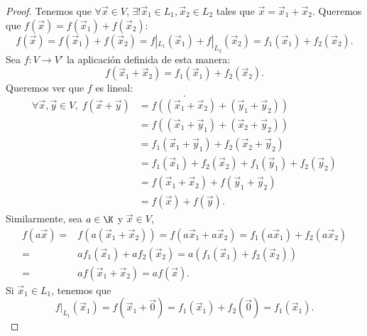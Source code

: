 \begin{proof}
Tenemos que $\displaystyle \forall\vec{x}\in V $, $\displaystyle \exists! \vec{x}_{1} \in L_{1}, \vec{x}_{2} \in L_{2} $ tales que $\displaystyle \vec{x} = \vec{x}_{1}+\vec{x}_{2} $. Queremos que $\displaystyle f\left(\vec{x}\right) = f\left(\vec{x}_{1}\right)+f\left(\vec{x}_{2}\right) $:
\[f\left(\vec{x}\right) = f\left(\vec{x}_{1}\right) + f\left(\vec{x}_{2}\right) = f|_{L_{1}}\left(\vec{x}_{1}\right) + f|_{L_{2}}\left(\vec{x}_{2}\right) = f_{1}\left(\vec{x}_{1}\right) + f_{2}\left(\vec{x}_{2}\right) .\]
Sea $\displaystyle f: V \to V' $ la aplicación definida de esta manera: 
\[f\left(\vec{x}_{1}+\vec{x}_{2}\right) = f_{1}\left(\vec{x}_{1}\right)+f_{2}\left(\vec{x}_{2}\right) .\]
Queremos ver que $\displaystyle f $ es lineal:
\[.\]
\[
\begin{split}
	\forall \vec{x}, \vec{y}\in V, \; f\left(\vec{x}+\vec{y}\right) & = f\left(\left(\vec{x}_{1}+\vec{x}_{2}\right)+\left(\vec{y}_{1}+\vec{y}_{2}\right)\right)\\
									&= f\left(\left(\vec{x}_{1}+\vec{y}_{1}\right)+\left(\vec{x}_{2}+\vec{y}_{2}\right)\right)\\
									&= f_{1}\left(\vec{x}_{1}+\vec{y}_{1}\right) +f_{2}\left(\vec{x}_{2}+\vec{y}_{2}\right)\\
									&= f_{1}\left(\vec{x}_{1}\right) + f_{2}\left(\vec{x}_{2}\right)+f_{1}\left(\vec{y}_{1}\right) + f_{2}\left(\vec{y}_{2}\right)\\
									&= f\left(\vec{x}_{1}+\vec{x}_{2}\right)+f\left(\vec{y}_{1}+\vec{y}_{2}\right) \\
									&= f\left(\vec{x}\right)+f\left(\vec{y}\right).
\end{split}
\]
Similarmente, sea $\displaystyle a \in \K $ y $\displaystyle \vec{x} \in V $, 
\[
\begin{split}
	f\left(a\vec{x}\right) = & f\left(a\left(\vec{x}_{1}+\vec{x}_{2}\right)\right) = f\left(a\vec{x}_{1}+a\vec{x}_{2}\right) 
	=  f_{1}\left(a\vec{x}_{1}\right)+f_{2}\left(a\vec{x}_{2}\right) \\
	= & a f_{1}\left(\vec{x}_{1}\right) + a f_{2}\left(\vec{x}_{2}\right) 
	=  a \left(f_{1}\left(\vec{x}_{1}\right)+f_{2}\left(\vec{x}_{2}\right)\right) \\
	= & a f\left(\vec{x}_{1}+\vec{x}_{2}\right)
	=  af\left(\vec{x}\right) .
\end{split}
\]
Si $\displaystyle \vec{x}_{1} \in L_{1} $, tenemos que 
\[f|_{L_{1}}\left(\vec{x}_{1}\right) = f\left(\vec{x}_{1}+\vec{0}\right) = f_{1}\left(\vec{x}_{1}\right)+f_{2}\left(\vec{0}\right) = f_{1}\left(\vec{x}_{1}\right) .\]
\end{proof}

